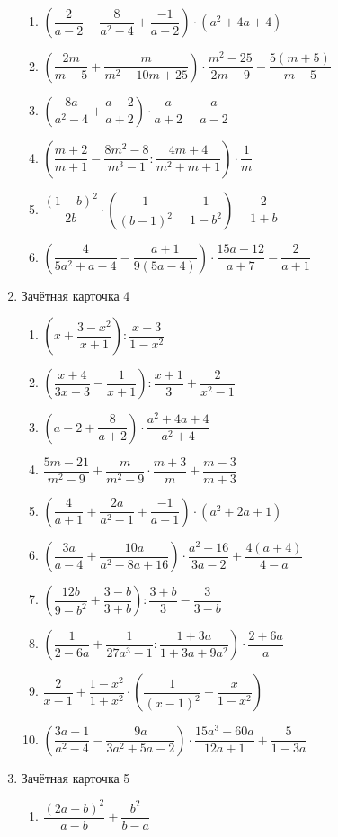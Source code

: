 \documentclass[12pt, a4paper]{article}
\begin{document}
\begin{enumerate}
\begin{enumerate}[label=\asbuk*)]
	\item \( \left( \dfrac{2}{a-2}-\dfrac{8}{a^2-4}+\dfrac{-1}{a+2} \right)\cdot(a^2+4a+4) \)
	\item \( \left( \dfrac{2m}{m-5}+\dfrac{m}{m^2-10m+25} \right) \cdot\dfrac{m^2-25}{2m-9}-\dfrac{5(m+5)}{m-5}\)
	\item \( \left( \dfrac{8a}{a^2-4}+\dfrac{a-2}{a+2} \right) \cdot\dfrac{a}{a+2}-\dfrac{a}{a-2}\)
	\item \( \left( \dfrac{m+2}{m+1}-\dfrac{8m^2-8}{m^3-1}:\dfrac{4m+4}{m^2+m+1} \right)\cdot\dfrac{1}{m} \)
	\item \( \dfrac{(1-b)^2}{2b}\cdot\left( \dfrac{1}{(b-1)^2}-\dfrac{1}{1-b^2} \right) -\dfrac{2}{1+b}\)
	\item \( \left( \dfrac{4}{5a^2+a-4}-\dfrac{a+1}{9(5a-4)} \right) \cdot\dfrac{15a-12}{a+7}-\dfrac{2}{a+1}\)
\end{enumerate}
\item Зачётная карточка 4
\begin{enumerate}[label=\asbuk*)]
	\item \( \left( x+\dfrac{3-x^2}{x+1} \right):\dfrac{x+3}{1-x^2} \)
	\item \( \left( \dfrac{x+4}{3x+3}-\dfrac{1}{x+1} \right):\dfrac{x+1}{3}+\dfrac{2}{x^2-1} \)
	\item \( \left( a-2+\dfrac{8}{a+2} \right) \cdot\dfrac{a^2+4a+4}{a^2+4}\)
	\item \( \dfrac{5m-21}{m^2-9}+\dfrac{m}{m^2-9}\cdot\dfrac{m+3}{m}+\dfrac{m-3}{m+3} \)
	\item \( \left( \dfrac{4}{a+1}+\dfrac{2a}{a^2-1}+\dfrac{-1}{a-1} \right)\cdot(a^2+2a+1) \)
	\item \( \left( \dfrac{3a}{a-4}+\dfrac{10a}{a^2-8a+16} \right) \cdot\dfrac{a^2-16}{3a-2}+\dfrac{4(a+4)}{4-a}\)
	\item \( \left( \dfrac{12b}{9-b^2}+\dfrac{3-b}{3+b} \right):\dfrac{3+b}{3}-\dfrac{3}{3-b} \)
	\item \( \left( \dfrac{1}{2-6a}+\dfrac{1}{27a^3-1}:\dfrac{1+3a}{1+3a+9a^2} \right)\cdot\dfrac{2+6a}{a} \)
	\item \( \dfrac{2}{x-1}+\dfrac{1-x^2}{1+x^2}\cdot\left( \dfrac{1}{(x-1)^2}-\dfrac{x}{1-x^2} \right) \)
	\item \( \left( \dfrac{3a-1}{a^2-4}-\dfrac{9a}{3a^2+5a-2} \right)\cdot\dfrac{15a^3-60a}{12a+1}+\dfrac{5}{1-3a} \)
\end{enumerate}
\item Зачётная карточка 5
\begin{enumerate}[label=\asbuk*)]
	\item \( \dfrac{(2a-b)^2}{a-b}+\dfrac{b^2}{b-a} \)

\end{enumerate}
\end{enumerate}
\end{document}
